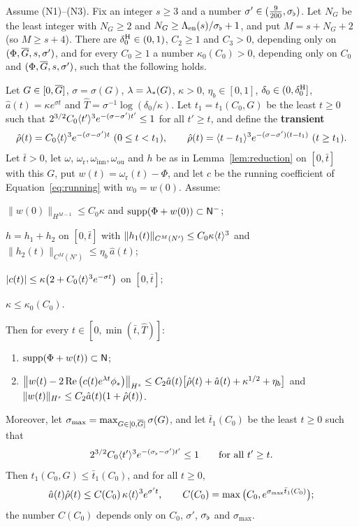 \begin{theorem}
\label{thm:active}
Assume \textup{(N1)}--\textup{(N3)}. Fix an integer $s\ge3$ and a number
$\sigma'\in(\frac9{200},\sigma_\flat)$. Let $N_G$ be the least integer
with $N_G\ge2$ and $N_G\ge\Lambda_{\mathrm{en}}(s)/\sigma_\flat+1$, and put $M=s+N_G+2$ (so $M\ge s+4$).
There are $\delta_0^{\mathrm{H}}\in(0,1)$, $C_2\ge1$ and $C_3>0$, depending only on
$(\Phi,\overline{G},s,\sigma')$, and for every $C_0\ge1$ a number $\kappa_0(C_0)>0$,
depending only on $C_0$ and $(\Phi,\overline{G},s,\sigma')$, such that the following holds.

Let $G\in[0,\overline{G}]$, $\sigma=\sigma(G)$, $\lambda=\lambda_*(G)$, $\kappa>0$,
$\eta_b\in[0,1]$, $\delta_0\in(0,\delta_0^{\mathrm{H}}]$, $\hat a(t)=\kappa e^{\sigma t}$ and
$\hat T=\sigma^{-1}\log(\delta_0/\kappa)$. Let $t_1=t_1(C_0,G)$ be the least
$t\ge0$ such that $2^{3/2}C_0\langle t'\rangle^3e^{-(\sigma-\sigma')t'}\le1$ for all $t'\ge t$,
and define the \textbf{transient}
\[
\rhohat(t)=C_0\jap{t}^3e^{-(\sigma-\sigma')t}\ (0\le t<t_1),\qquad
\rhohat(t)=\jap{t-t_1}^3e^{-(\sigma-\sigma')(t-t_1)}\ (t\ge t_1).
\]
Let $\bar t>0$, let $\omega$, $\omega_{\mathrm r},\omega_{\mathrm{inn}},\omega_{\mathrm{ou}}$
and $h$ be as in Lemma~\ref{lem:reduction} on $[0,\bar t]$ with this $G$, put
$w(t)=\omega_{\mathrm r}(t)-\Phi$, and let $c$ be the running coefficient of
Equation~\eqref{eq:running} with $w_0=w(0)$. Assume:
\begin{description}[font=\normalfont]
\item[\textup{(Init)}] $\|w(0)\|_{H^{M-1}}\le C_0\kappa$ and $\operatorname{supp}(\Phi+w(0))\subset\mathsf{N}^{-}$;
\item[\textup{(Field)}] $h=h_1+h_2$ on $[0,\bar t]$ with
  $\|h_1(t)\|_{C^M(N')}\le C_0\kappa\langle t\rangle^3$ and
  $\|h_2(t)\|_{C^M(N')}\le\eta_b\,\hat a(t)$;
\item[\textup{(Coef)}] $|c(t)|\le\kappa\big(2+C_0\langle t\rangle^3e^{-\sigma t}\big)$ on $[0,\bar t]$;
\item[\textup{(Small)}] $\kappa\le\kappa_0(C_0)$.
\end{description}
Then for every $t\in[0,\min(\bar t,\hat T)]$:
\begin{enumerate}[label=\textup{(\alph*)}]
\item $\operatorname{supp}(\Phi+w(t))\subset\mathsf{N}$;
\item $\big\|w(t)-2\Re\big(c(t)e^{\lambda t}\phi_*\big)\big\|_{H^s}\le
  C_2\hat a(t)\big[\hat\rho(t)+\hat a(t)+\kappa^{1/2}+\eta_b\big]$ and
  $\|w(t)\|_{H^s}\le C_2\hat a(t)(1+\hat\rho(t))$.
\end{enumerate}
Moreover, let $\sigma_{\max}=\max_{G\in[0,\overline{G}]}\sigma(G)$, and let $\bar t_1(C_0)$ be the
least $t\ge0$ such that
\[
2^{3/2}C_0\langle t'\rangle^3e^{-(\sigma_\flat-\sigma')t'}\le1\qquad\text{for all }t'\ge t .
\]
Then $t_1(C_0,G)\le\bar t_1(C_0)$, and for all $t\ge0$,
\begin{equation}
\label{eq:active-transient}
\hat a(t)\hat\rho(t)\le C(C_0)\,\kappa\langle t\rangle^3e^{\sigma't},\qquad
C(C_0)=\max\big(C_0,e^{\sigma_{\max}\bar t_1(C_0)}\big);
\end{equation}
the number $C(C_0)$ depends only on $C_0$, $\sigma'$, $\sigma_\flat$ and $\sigma_{\max}$.
\end{theorem}

